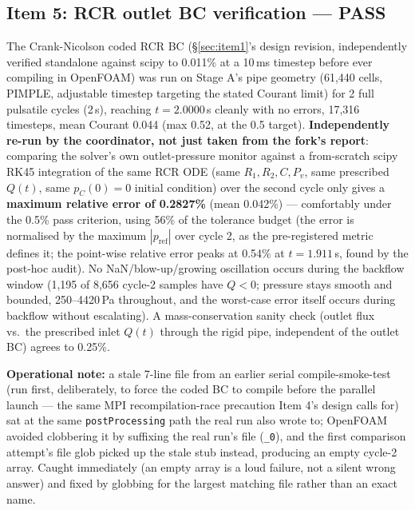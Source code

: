 \documentclass[11pt]{article}
\newcommand{\PASS}{\textcolor{passgreen}{\textbf{PASS}}}
\begin{document}
\subsection{Item 5: RCR outlet BC verification --- \PASS{}}
\label{sec:item5-status}
The Crank-Nicolson coded RCR BC (\S\ref{sec:item1}'s design revision, independently verified standalone
against scipy to 0.011\% at a 10\,ms timestep before ever compiling in OpenFOAM) was run on Stage A's
pipe geometry (61,440 cells, PIMPLE, adjustable timestep targeting the stated Courant limit) for 2 full
pulsatile cycles (2\,s), reaching $t=2.0000$\,s cleanly with no errors, 17,316 timesteps, mean Courant
0.044 (max 0.52, at the 0.5 target). \textbf{Independently re-run by the coordinator, not just taken
from the fork's report}: comparing the solver's own outlet-pressure monitor against a from-scratch scipy
RK45 integration of the same RCR ODE (same $R_1,R_2,C,P_v$, same prescribed $Q(t)$, same $p_C(0)=0$
initial condition) over the second cycle only gives a \textbf{maximum relative error of 0.2827\%} (mean
0.042\%) --- comfortably under the 0.5\% pass criterion, using 56\% of the tolerance budget (the error is normalised by the maximum $|p_\text{ref}|$ over cycle 2, as the pre-registered metric defines it; the point-wise relative error peaks at 0.54\% at $t=1.911$\,s, found by the post-hoc audit). No
NaN/blow-up/growing oscillation occurs during the backflow window (1,195 of 8,656 cycle-2 samples have
$Q<0$; pressure stays smooth and bounded, 250--4420\,Pa throughout, and the worst-case error itself
occurs during backflow without escalating). A mass-conservation sanity check (outlet flux vs.\ the
prescribed inlet $Q(t)$ through the rigid pipe, independent of the outlet BC) agrees to 0.25\%.

\textbf{Operational note:} a stale 7-line file from an earlier serial compile-smoke-test (run first,
deliberately, to force the coded BC to compile before the parallel launch --- the same MPI
recompilation-race precaution Item 4's design calls for) sat at the same \texttt{postProcessing} path
the real run also wrote to; OpenFOAM avoided clobbering it by suffixing the real run's file
(\texttt{\_\allowbreak{}0}), and the first comparison attempt's file glob picked up the stale stub instead, producing
an empty cycle-2 array. Caught immediately (an empty array is a loud failure, not a silent wrong
answer) and fixed by globbing for the largest matching file rather than an exact name.
\end{document}
